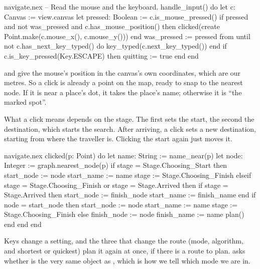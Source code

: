 \begin{continued}{navigate.nex}
  -- Read the mouse and the keyboard.
  handle_input() do
    let c: Canvas := view.canvas
    let pressed: Boolean := c.is_mouse_pressed()
    if pressed and not was_pressed and c.has_mouse_position() then
      clicked(create Point.make(c.mouse_x(), c.mouse_y()))
    end
    was_pressed := pressed
    from
    until
      not c.has_next_key_typed()
    do
      key_typed(c.next_key_typed())
    end
    if c.is_key_pressed(Key.ESCAPE) then
      quitting := true
    end
  end
\end{continued}

 and  give the mouse's position in the
canvas's own coordinates, which are our metres. So a click is already a
point on the map, ready to snap to the nearest node. If it is near a
place's dot, it takes the place's name; otherwise it is ``the marked spot''.

What a click means depends on the stage. The first sets the start, the
second the destination, which starts the search. After arriving, a click
sets a new destination, starting from where the traveller is. Clicking the
start again just moves it.

\begin{continued}{navigate.nex}
  clicked(p: Point) do
    let name: String := name_near(p)
    let node: Integer := graph.nearest_node(p)
    if stage = Stage.Choosing_Start then
      start_node := node
      start_name := name
      stage := Stage.Choosing_Finish
    elseif stage = Stage.Choosing_Finish or stage = Stage.Arrived then
      if stage = Stage.Arrived then
        start_node := finish_node
        start_name := finish_name
      end
      if node = start_node then
        start_node := node
        start_name := name
        stage := Stage.Choosing_Finish
      else
        finish_node := node
        finish_name := name
        plan()
      end
    end
  end
\end{continued}

Keys change a setting, and the three that change the route (mode,
algorithm, and shortest or quickest) plan it again at once, if there is a
route to plan.  asks whether  is the
very same object as , which is how we tell which mode we are
in.

